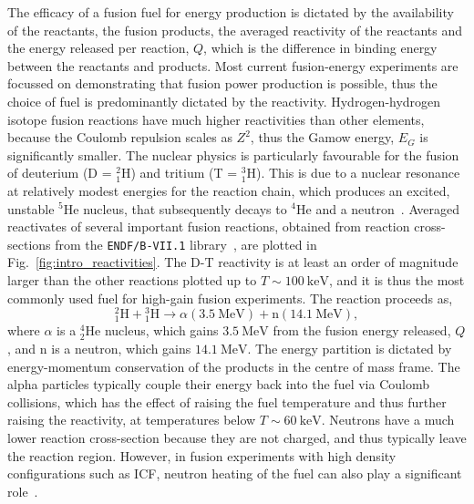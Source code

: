 The efficacy of a fusion fuel for energy production is dictated by the availability of the reactants, the fusion products, the averaged reactivity of the reactants and the energy released per reaction, $Q$, which is the difference in binding energy between the reactants and products.
Most current fusion-energy experiments are focussed on demonstrating that fusion power production is possible, thus the choice of fuel is predominantly dictated by the reactivity.
Hydrogen-hydrogen isotope fusion reactions have much higher reactivities than other elements, because the Coulomb repulsion scales as $Z^2$, thus the Gamow energy, $E_G$ is significantly smaller.
The nuclear physics is particularly favourable for the fusion of deuterium (D = ${}^{2}_{1}\text{H}$) and tritium (T = ${}^{3}_{1}\text{H}$).
This is due to a nuclear resonance at relatively modest energies for the reaction chain, which produces an excited, unstable ${}^5 \text{He}$ nucleus, that subsequently decays to ${}^4\text{He}$ and a neutron~\cite{brown_field_2014}.
Averaged reactivates of several important fusion reactions, obtained from reaction cross-sections from the \texttt{ENDF/B-VII.1} library~\cite{chadwick_endf_2011}, are plotted in Fig.~\ref{fig:intro_reactivities}.
The D-T reactivity is at least an order of magnitude larger than the other reactions plotted up to $T\sim100\ \text{keV}$, and it is thus the most commonly used fuel for high-gain fusion experiments.
The reaction proceeds as,
\begin{equation}
    \label{eq:intro_DTreac}
    {}^{2}_{1}\text{H} + {}^{3}_{1}\text{H} \rightarrow \alpha(3.5\ \text{MeV}) + \text{n}(14.1\ \text{MeV}),
\end{equation}
where $\alpha$ is a ${}^{4}_{2}\text{He}$ nucleus, which gains $3.5\ \text{MeV}$ from the fusion energy released, $Q$, and $\text{n}$ is a neutron, which gains $14.1\ \text{MeV}$.
The energy partition is dictated by energy-momentum conservation of the products in the centre of mass frame.
The alpha particles typically couple their energy back into the fuel via Coulomb collisions, which has the effect of raising the fuel temperature and thus further raising the reactivity, at temperatures below $T\sim60\ \text{keV}$.
Neutrons have a much lower reaction cross-section because they are not charged, and thus typically leave the reaction region.
However, in fusion experiments with high density configurations such as \ac{ICF}, neutron heating of the fuel can also play a significant role~\cite{daughton_influence_2023}.

